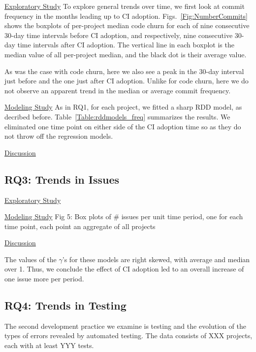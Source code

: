 \documentclass[conference]{IEEEtran}
\begin{document}
\noindent \underline{Exploratory Study} To explore general trends over time, we first look at commit frequency in the months leading up to CI adoption.
Figs.~\ref{Fig:NumberCommits} shows the boxplots of per-project median code churn for each of nine consecutive 30-day time intervals before CI adoption, and respectively, nine consecutive 30-day time intervals after CI adoption.
The vertical line in each boxplot is the median value of all per-project median, and the black dot is their average value.

As was the case with code churn, here we also see a peak in the 30-day interval just before and the one just after CI adoption.
Unlike for code churn, here we do not observe an apparent trend in the median or average commit frequency.

\noindent \underline{Modeling Study} 
As in RQ1, for each project, we fitted a sharp RDD model, as decribed before.
Table~\ref{Table:rddmodels_freq} summarizes the results.
We eliminated one time point on either side of the CI adoption time so as they do not throw off the regression models.



\noindent \underline{Discussion}




\subsection{RQ3: Trends in Issues}

\noindent \underline{Exploratory Study}


\noindent \underline{Modeling Study}
Fig 5: Box plots of \# issues per unit time period, one for each time point, each point an aggregate of all projects


\noindent \underline{Discussion}


The values of the $\gamma$'s for these models are right skewed, with average and median over 1. Thus, we conclude the effect of CI adoption led to an overall increase of one issue more per period.




\subsection{RQ4: Trends in Testing}

The second development practice we examine is testing and the evolution of the types of errors revealed by automated testing.
The data consists of XXX projects, each with at least YYY tests.
\end{document}
